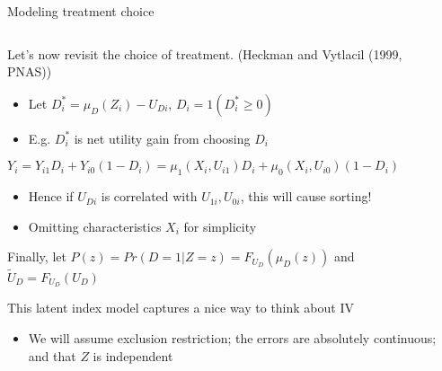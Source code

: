 \documentclass[notes,11pt, aspectratio=169]{beamer}
\newenvironment{wideitemize}{\itemize\addtolength{\itemsep}{10pt}}{\enditemize}
\begin{document}
\begin{frame}{Modeling treatment choice}
  \begin{columns}[T] %
    \begin{column}{0.95\textwidth}
      \begin{wideitemize}
      \item Let's now revisit the choice of treatment. (Heckman and Vytlacil (1999, PNAS))
        \begin{itemize}
        \item Let $D_{i}^{*} = \mu_{D}(Z_{i}) - U_{Di}$, $D_{i} = 1(D_{i}^{*} \ge 0)$
          \item E.g. $D_{i}^{*}$ is net utility gain from choosing $D_{i}$
          \end{itemize}
        \item $Y_{i} = Y_{i1}D_{i} + Y_{i0}(1-D_{i}) = \mu_{1}(X_{i}, U_{i1})D_{i} + \mu_{0}(X_{i}, U_{i0})(1-D_{i})$
          \begin{itemize}
          \item Hence if $U_{Di}$ is correlated with
            $ U_{1i},U_{0i}$, this will cause sorting!
          \item Omitting characteristics $X_{i}$ for simplicity
          \end{itemize}
        \item Finally, let $P(z) = Pr(D = 1 | Z = z) = F_{U_{D}}(\mu_{D}(z))$ and $\tilde{U}_{D} = F_{U_{D}}(U_{D})$
        \item This latent index model captures a nice way to think about IV
          \begin{itemize}
          \item We will assume exclusion restriction; the errors are
            absolutely continuous; and that $Z$ is independent
          \end{itemize}
      \end{wideitemize}
\end{column}
\begin{column}{0.4\textwidth}
\end{column}
\end{columns}
\end{frame}
\end{document}
